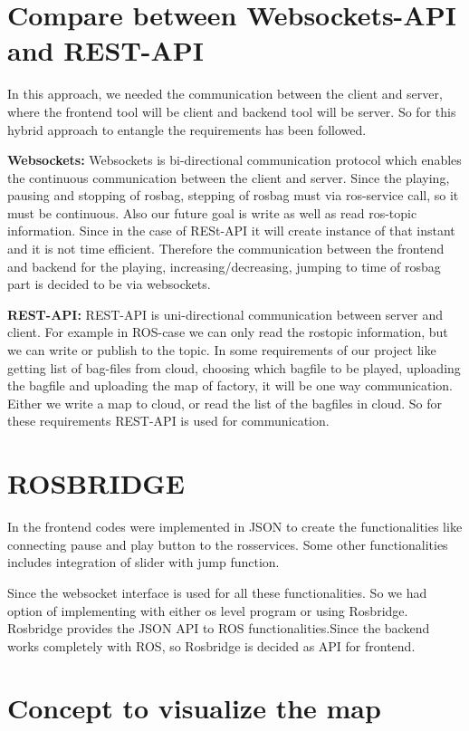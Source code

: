 \section{Compare between Websockets-API and REST-API} 

In this approach, we needed the communication between the client and server, where the frontend tool will be client and backend tool will be server. So for this hybrid approach to entangle the requirements has been followed. 

\textbf{Websockets:} Websockets is bi-directional communication protocol which enables the continuous communication between the client and server. Since the playing, pausing and stopping of rosbag, stepping of rosbag must via ros-service call, so it must be continuous. Also our future goal is write as well as read ros-topic information. Since in the case of RESt-API it will create instance of that instant and it is not time efficient. Therefore the communication between the frontend and backend for the playing, increasing/decreasing, jumping to time of rosbag part is decided to be via websockets. 
 
\textbf{REST-API:} REST-API is uni-directional communication between server and client. For example in ROS-case we can only read the rostopic information, but we can write or publish to the topic. In some requirements of our project like getting list of bag-files from cloud, choosing which bagfile to be played, uploading the bagfile and uploading the map of factory, it will be one way communication. Either we write a map to cloud, or read the list of the bagfiles in cloud. So for these requirements REST-API is used for communication. 

\section{ROSBRIDGE}
In the frontend codes were implemented in JSON to create the functionalities like connecting pause and play button to the rosservices. Some other functionalities includes integration of slider with jump function.

Since the websocket interface is used for all these functionalities. So we had option of implementing with either os level program or using Rosbridge. Rosbridge provides the JSON API to ROS functionalities.Since the backend works completely with ROS, so Rosbridge is decided as API for frontend. 
 

\section{Concept to visualize the map}

